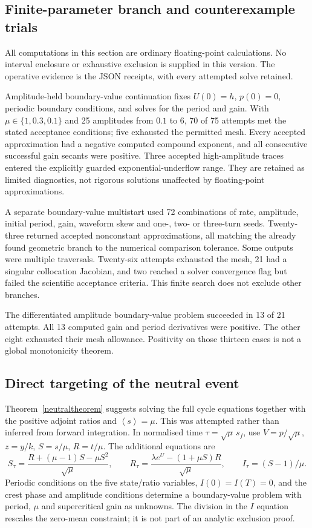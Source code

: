 \documentclass[11pt,a4paper]{article}
\theoremstyle{remark}\newtheorem{remark}[theorem]{Remark}
\newcommand{\av}[1]{\left\langle #1\right\rangle}
\begin{document}
\subsection{Finite-parameter branch and counterexample trials}
All computations in this section are ordinary floating-point calculations. No interval enclosure or exhaustive exclusion is supplied in this version. The operative evidence is the JSON receipts, with every attempted solve retained.

Amplitude-held boundary-value continuation fixes $U(0)=h$, $p(0)=0$, periodic boundary conditions, and solves for the period and gain. With $\mu\in\{1,0.3,0.1\}$ and 25 amplitudes from $0.1$ to $6$, 70 of 75 attempts met the stated acceptance conditions; five exhausted the permitted mesh. Every accepted approximation had a negative computed compound exponent, and all consecutive successful gain secants were positive. Three accepted high-amplitude traces entered the explicitly guarded exponential-underflow range. They are retained as limited diagnostics, not rigorous solutions unaffected by floating-point approximations.

A separate boundary-value multistart used 72 combinations of rate, amplitude, initial period, gain, waveform skew and one-, two- or three-turn seeds. Twenty-three returned accepted nonconstant approximations, all matching the already found geometric branch to the numerical comparison tolerance. Some outputs were multiple traversals. Twenty-six attempts exhausted the mesh, 21 had a singular collocation Jacobian, and two reached a solver convergence flag but failed the scientific acceptance criteria. This finite search does not exclude other branches.

The differentiated amplitude boundary-value problem succeeded in 13 of 21 attempts. All 13 computed gain and period derivatives were positive. The other eight exhausted their mesh allowance. Positivity on those thirteen cases is not a global monotonicity theorem.

\subsection{Direct targeting of the neutral event}
Theorem~\ref{neutraltheorem} suggests solving the full cycle equations together with the positive adjoint ratios and $\av{s}=\mu$. This was attempted rather than inferred from forward integration. In normalised time $\tau=\sqrt\mu\,s_f$, use $V=p/\sqrt\mu$, $z=y/k$, $S=s/\mu$, $R=t/\mu$. The additional equations are
\[
 S_\tau=\frac{R+(\mu-1)S-\mu S^2}{\sqrt\mu},\qquad
 R_\tau=\frac{\lambda e^U-(1+\mu S)R}{\sqrt\mu},\qquad
 I_\tau=(S-1)/\mu.
\]
Periodic conditions on the five state/ratio variables, $I(0)=I(T)=0$, and the crest phase and amplitude conditions determine a boundary-value problem with period, $\mu$ and supercritical gain as unknowns. The division in the $I$ equation rescales the zero-mean constraint; it is not part of an analytic exclusion proof.
\end{document}
